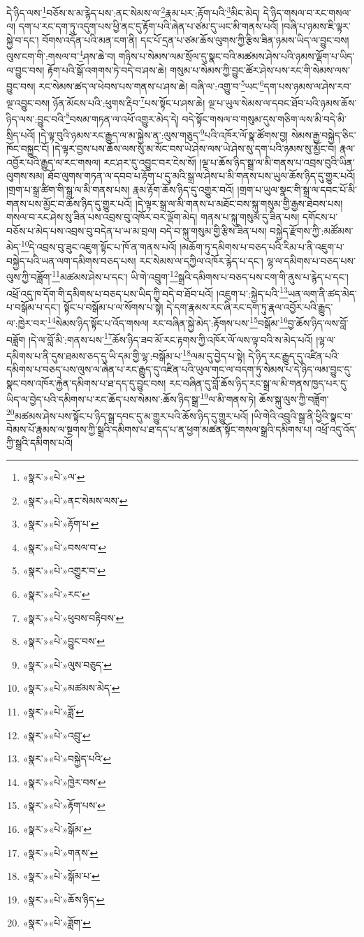 དེ་ཉིད་ལས་\footnote{«སྣར་»«པེ་»ལ་}བཅོས་ས་མ་རྙེད་པས་:ནང་སེམས་ལ་\footnote{«སྣར་»«པེ་»ནང་སེམས་ལས་}རྣམ་པར་:རྟོག་པའི་\footnote{«སྣར་»«པེ་»རྟོག་པ་}མིང་མེད། དེ་ཉིད་གསལ་བ་རང་གསལ་ལ། དག་པ་རང་དག་ཏུ་འདུག་པས་ཕྱི་ནང་དུ་རྟོག་པའི་ཞེན་པ་ཙམ་དུ་ཡང་མི་གནས་པའོ། །བཞི་པ་ཉམས་ཇི་ལྟར་སྐྱེ་བ་དང་། བོགས་འདོན་པའི་མན་ངག་ནི། དང་པོ་དྲན་པ་ཙམ་ཆོས་ལུགས་ཀྱི་རྩིས་ཟིན་ཉམས་ཡིད་ལ་བྱུང་བས། ལུས་ངག་གི་:གསལ་བ་\footnote{«སྣར་»«པེ་»བསལ་བ་}ཤས་ཆེ་བ། གཉིས་པ་སེམས་ལམ་སྲོལ་དུ་སྣང་བའི་མཚམས་ཤེས་པའི་ཉམས་ལྡོག་པ་ཡིད་ལ་བྱུང་བས། རྟོག་པའི་སྒོ་འགགས་ཏེ་བདེ་བ་ཤས་ཆེ། གསུམ་པ་སེམས་ཀྱི་བྱུང་ཚོར་ཤེས་པས་རང་གི་སེམས་ལས་བྱུང་བས། རང་སེམས་ཚད་ལ་ཕེབས་པས་གནས་པ་ཤས་ཆེ། བཞི་ལ་:འགྱུ་བ་\footnote{«སྣར་»«པེ་»འགྱུར་བ་}ཡང་\footnote{«སྣར་»«པེ་»རང་}དག་པས་ཉམས་ལ་ཤེས་རབ་ལྔ་འབྱུང་བས། ཉོན་མོངས་པའི་:ཕུགས་རྡིབ་\footnote{«སྣར་»«པེ་»ཕུབས་བརྟིབས་}པས་སྟོང་པ་ཤས་ཆེ། ལྔ་པ་ཡུལ་སེམས་ལ་དབང་ཐོབ་པའི་ཉམས་ཆོས་ཉིད་ལས་:བྱུང་བའི་\footnote{«སྣར་»«པེ་»བྱུང་བས་}བསམ་གཏན་ལ་འཕོ་འགྱུར་མེད་དེ། བདེ་སྟོང་གསལ་བ་གསུམ་དུས་གཅིག་ལས་མི་བདེ་མི་སྲིད་པའོ། །དེ་ལྟ་བུའི་ཉམས་རང་རྒྱུད་ལ་མ་སྐྱེས་ན་:ལུས་གཅུད་\footnote{«སྣར་»«པེ་»ལུས་བཅུད་}པའི་འཁོར་ལོ་སྣ་ཚོགས་བྱ། སེམས་རྒྱ་བསྐྱེད་ཅིང་ཁོང་བསྐྱུང་ངོ། །དེ་ལྟར་བྱས་པས་ཆོས་ལས་སུ་མ་སོང་བས་ཡེ་ཤེས་ལས་ཡེ་ཤེས་སུ་དག་པའི་ཉམས་སུ་མྱོང་བ། རྣལ་འབྱོར་པའི་རྒྱུད་ལ་རང་གསལ། རང་ཤར་དུ་འབྱུང་བར་ངེས་སོ། །ལྔ་པ་ཆོས་ཉིད་སྒྲ་ལ་མི་གནས་པ་འབྲས་བུའི་ཡིན་ལུགས་སམ། ཐོབ་ལུགས་གཏན་ལ་དབབ་པ་རྟོག་པ་དུ་མའི་སྒྲ་ལ་ཤེས་པ་མི་གནས་པས་ཡུལ་ཆོས་ཉིད་དུ་གྱུར་པའོ། །གྲག་པ་སྒྲ་ཚིག་གི་སྒྲ་ལ་མི་གནས་པས། རྣམ་རྟོག་ཆོས་ཉིད་དུ་འགྱུར་བའོ། །གྲག་པ་ཡུལ་སྣང་གི་སྒྲ་ལ་དབང་པོ་མི་གནས་པས་མྱོང་བ་ཆོས་ཉིད་དུ་གྱུར་པའོ། །དེ་ལྟར་སྒྲ་ལ་མི་གནས་པ་མཐོང་བས་སྐུ་གསུམ་གྱི་རྒྱས་ཐེབས་པས། གསལ་བ་རང་ཤེས་སུ་ཟིན་པས་འབྲས་བུ་འཁོར་བར་ལྡོག་མེད། གནས་པ་སྐུ་གསུམ་དུ་ཟིན་པས། དགོངས་པ་བཅོས་པ་མེད་པས་འབྲས་བུ་བདེན་པ་ཡ་མ་བྲལ། བདེ་བ་སྐུ་གསུམ་གྱི་རྩིས་ཟིན་པས། བསྐྱེད་རྫོགས་ཀྱི་:མཚོམས་མེད་\footnote{«སྣར་»«པེ་»མཚམས་མེད་}དེ་འབྲས་བུ་ཟུང་འཇུག་སྟོང་པ་ཁོ་ན་གནས་པའོ། །མཆོག་ཏུ་དམིགས་པ་བཅད་པའི་རིམ་པ་ནི་འཇུག་པ་བསྐྱེད་པའི་ཡན་ལག་དམིགས་བཅད་པས། རང་སེམས་ལ་དཀྱིལ་འཁོར་རྙེད་པ་དང་། ལྷ་ལ་དམིགས་པ་བཅད་པས་ལུས་ཀྱི་བཟློག་\footnote{«སྣར་»«པེ་»ཟློ་}མཚམས་ཤེས་པ་དང་། ཡི་གེ་འབྲུག་\footnote{«སྣར་»«པེ་»འབྲུ་}སྒྲའི་དམིགས་པ་བཅད་པས་ངག་གི་ནུས་པ་རྙེད་པ་དང་། འཕྲོ་འདུ་ཁ་དོག་གི་དམིགས་པ་བཅད་པས་ཡིད་ཀྱི་བདེ་བ་ཐོབ་པའོ། །འཇུག་པ་:སྐྱེད་པའི་\footnote{«སྣར་»«པེ་»བསྐྱེད་པའི་}ཡན་ལག་ནི་ཚད་མེད་པ་བསྒོམ་པ་དང་། སྟོང་པ་བསྒོམ་པ་ལ་སོགས་པ་སྟེ། དེ་དག་རྣམས་རང་ཞི་རང་དག་ཏུ་རྣལ་འབྱོར་པའི་རྒྱུད་ལ་:ཁྱེར་བར་\footnote{«སྣར་»«པེ་»ཁྱེར་བས་}སེམས་ཉིད་སྟོང་པ་འོད་གསལ། རང་བཞིན་སྐྱེ་མེད་:རྟོགས་པས་\footnote{«སྣར་»«པེ་»རྟོག་པས་}བསྒོམ་\footnote{«སྣར་»«པེ་»སྒོམ་}བྱ་ཆོས་ཉིད་ལས་བློ་བཟློག །དེ་ལ་བློ་མི་:གནས་པས་\footnote{«སྣར་»«པེ་»གནས་}ཆོས་ཉིད་ཟབ་མོ་རང་རྟགས་ཀྱི་འཁོར་ལོ་ལས་ལྟ་བའི་ས་མེད་པའོ། །ལྷ་ལ་དམིགས་པ་ནི་དུས་ཐམས་ཅད་དུ་ཡི་དམ་གྱི་ལྷ་:བསྒོམ་པ་\footnote{«སྣར་»«པེ་»སྒོམ་པ་}ལམ་དུ་བྱེད་པ་སྟེ། དེ་ཉིད་རང་རྒྱུད་དུ་འཛིན་པའི་དམིགས་པ་བཅད་པས་ལུས་ལ་ཞེན་པ་རང་རྒྱུད་དུ་འཛིན་པའི་ཡུལ་གང་ལ་བདག་ཏུ་སེམས་པ་དེ་ཉིད་ལམ་བྱུང་དུ་སྣང་བས་འཁོར་རྐྱེན་དམིགས་པ་ཐ་དད་དུ་བྱུང་བས། རང་བཞིན་དུ་བློ་ཆོས་ཉིད་རང་སྒྲ་ལ་མི་གནས་ཁྱད་པར་དུ་ཡིད་ལ་བྱེད་པའི་དམིགས་པ་རང་ཆོད་པས་སེམས་:ཆོས་ཉིད་སྒྲ་\footnote{«སྣར་»«པེ་»ཆོས་ཉིད་}ལ་མི་གནས་ཏེ། ཆོས་སྐུ་ལུས་ཀྱི་བཟློག་\footnote{«སྣར་»«པེ་»ཟློག་}མཚམས་ཤེས་པས་སྟོང་པ་ཉིད་སྒྲ་དབང་དུ་མ་གྱུར་པའི་ཆོས་ཉིད་དུ་གྱུར་པའོ། །ཡི་གེའི་འབྲུའི་སྒྲ་ནི་ཕྱིའི་སྣང་བ་བེམས་པོ་རྣམས་ལ་སྔགས་ཀྱི་སྒྲའི་དམིགས་པ་ཐ་དད་པ་ན་ཕྱག་མཚན་སྟོང་གསལ་སྒྲའི་དམིགས་པ། འཕྲོ་འདུ་འོད་ཀྱི་སྒྲའི་དམིགས་པའོ། 